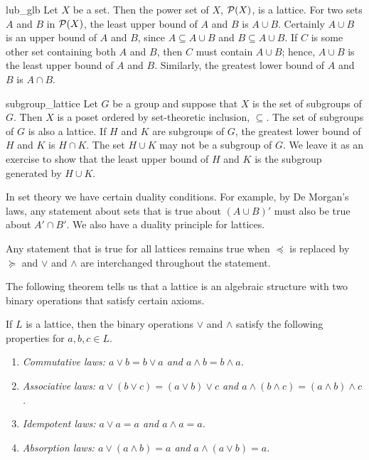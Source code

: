  

\begin{example}{lub_glb}
Let $X$ be a set. Then the power set of $X$, ${\cal P}(X)$, is a
lattice. For two sets $A$ and $B$ in ${\cal P}(X)$, the least upper
bound of $A$ and $B$ is $A \cup B$. Certainly $A \cup B$ is an upper
bound of $A$ and $B$, since $A \subseteq A \cup B$ and $B \subseteq A
\cup B$.  If $C$ is some other set containing both $A$ and $B$, then
$C$ must contain $A \cup B$; hence, $A \cup B$ is the least upper bound
of $A$ and $B$. Similarly,  the greatest lower bound of $A$ and $B$ is
$A \cap B$.
\end{example}
 
 

\begin{example}{subgroup_lattice}
Let $G$ be a group and suppose that $X$ is the set of subgroups of
$G$.  Then $X$ is a poset ordered by set-theoretic inclusion,
$\subseteq$.  The set of subgroups of $G$ is also a lattice.  If $H$
and $K$ are subgroups of $G$, the greatest lower bound of $H$ and $K$
is $H \cap K$. The set $H \cup K$ may not be a subgroup of $G$.  We
leave it as an exercise to show that the least upper bound of $H$ and
$K$ is the subgroup generated by $H \cup K$. 
\end{example}
 

 
 
In set theory we have certain duality conditions. For example, by De
Morgan's laws, any statement about sets that is true about $(A \cup
B)'$ must also be true about $A' \cap B'$. We also have a duality
principle for lattices. 
 
 
\medskip
 
 
Any statement that is true for all lattices remains true when
$\preceq$ is replaced by $\succeq$ and $\vee$ and $\wedge$ are
interchanged throughout the statement.
 
 
\medskip
 
 
The following theorem tells us that a lattice is an algebraic
structure with two binary operations that satisfy certain
axioms.						     
 
 
\begin{theorem}
If $L$ is a lattice, then the binary operations $\vee$ and $\wedge$
satisfy the following properties for $a, b, c \in L$.
\begin{enumerate}
 
\rm \item \it
Commutative laws: $a \vee b = b \vee a$ and $a \wedge b = b \wedge a$.
 
\rm \item \it
Associative laws: $a \vee ( b \vee c) = (a \vee b) \vee c$ and $a \wedge (
b \wedge c) = (a \wedge b) \wedge c$. 
 
\rm \item \it
Idempotent laws: $a \vee a = a$ and $a \wedge a = a$.
 
\rm \item \it
Absorption laws: $a \vee (a \wedge b) = a$ and $a \wedge ( a \vee b ) =a$.
 
\end{enumerate}
\end{theorem}
 
